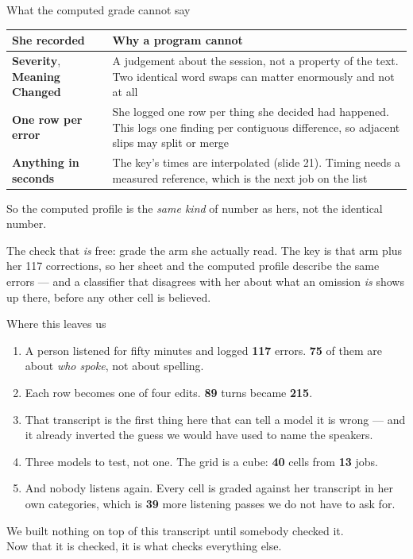 \documentclass[aspectratio=169]{beamer}
\newcommand{\keybox}[1]{%
  \par\vspace{4pt}\begingroup\centering
  \colorbox{warmbg}{\parbox{0.93\textwidth}{\centering #1}}%
  \par\endgroup\vspace{2pt}}
\newcommand{\bigidea}[1]{%
  \vfill
  \begingroup\centering
  \colorbox{warmbg}{\parbox{0.93\textwidth}{\centering \large #1}}%
  \par\endgroup
  \vfill}
\newenvironment{nicetable}[1]
  {\par\vspace{2pt}\begingroup\centering\small
   \renewcommand{\arraystretch}{1.18}%
   \setlength{\tabcolsep}{6pt}\rowcolors{2}{band}{white}%
   \begin{tabular}{#1}\arrayrulecolor{hdr}\toprule}
  {\bottomrule\end{tabular}\par\endgroup\vspace{2pt}}
\newcommand{\hd}[1]{\textcolor{hdr}{\textbf{#1}}}
\newcommand{\num}[1]{\textcolor{warm}{\textbf{#1}}}
\begin{document}
\begin{frame}{What the computed grade cannot say}

\begin{nicetable}{p{5.2cm}p{7.6cm}}
\hd{She recorded} & \hd{Why a program cannot} \\ \midrule
\textbf{Severity}, \textbf{Meaning Changed}
  & A judgement about the session, not a property of the text. Two identical word swaps can
    matter enormously and not at all \\
\textbf{One row per error}
  & She logged one row per thing she decided had happened. This logs one finding per
    contiguous difference, so adjacent slips may split or merge \\
\textbf{Anything in seconds}
  & The key's times are interpolated (slide 21). Timing needs a measured reference, which
    is the next job on the list \\
\end{nicetable}

\vspace{0.1em}
So the computed profile is the \emph{same kind} of number as hers, not the identical number.

\keybox{The check that \emph{is} free: grade the arm she actually read. The key is that arm
plus her 117 corrections, so her sheet and the computed profile describe the same errors ---
and a classifier that disagrees with her about what an omission \emph{is} shows up there,
before any other cell is believed.}

\end{frame}

\begin{frame}{Where this leaves us}

\begin{enumerate}
\itemsep 0.5em
\item A person listened for fifty minutes and logged \num{117} errors. \num{75} of them are
      about \emph{who spoke}, not about spelling.
\item Each row becomes one of four edits. \num{89} turns became \num{215}.
\item That transcript is the first thing here that can tell a model it is wrong --- and it
      already inverted the guess we would have used to name the speakers.
\item Three models to test, not one. The grid is a cube: \num{40} cells from \num{13} jobs.
\item And nobody listens again. Every cell is graded against her transcript in her own
      categories, which is \num{39} more listening passes we do not have to ask for.
\end{enumerate}

\bigidea{We built nothing on top of this transcript until somebody checked it.\\[3pt]
Now that it is checked, it is what checks everything else.}

\end{frame}
\end{document}
